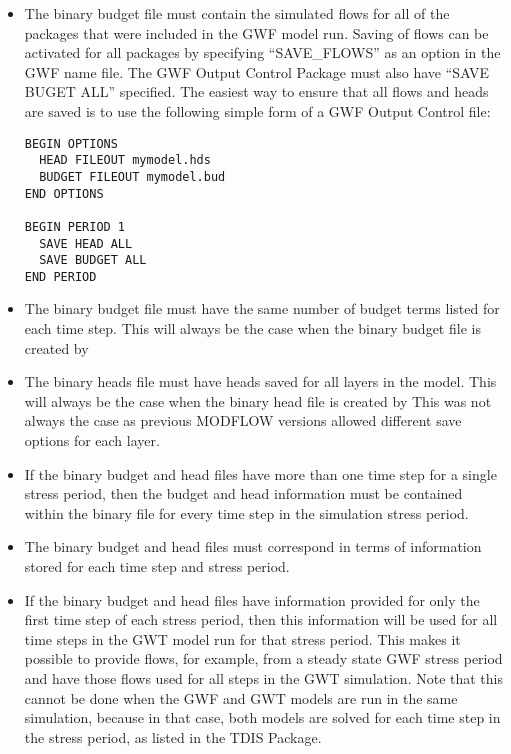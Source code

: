 \begin{itemize}
\begin{itemize}
\item The binary budget file must contain the simulated flows for all of the packages that were included in the GWF model run.  Saving of flows can be activated for all packages by specifying ``SAVE\_FLOWS'' as an option in the GWF name file.  The GWF Output Control Package must also have ``SAVE BUGET ALL'' specified.  The easiest way to ensure that all flows and heads are saved is to use the following simple form of a GWF Output Control file:

\begin{verbatim}
BEGIN OPTIONS
  HEAD FILEOUT mymodel.hds
  BUDGET FILEOUT mymodel.bud
END OPTIONS

BEGIN PERIOD 1
  SAVE HEAD ALL
  SAVE BUDGET ALL
END PERIOD
\end{verbatim}

\item The binary budget file must have the same number of budget terms listed for each time step.  This will always be the case when the binary budget file is created by \mfdot
\item The binary heads file must have heads saved for all layers in the model.  This will always be the case when the binary head file is created by \mfdot  This was not always the case as previous MODFLOW versions allowed different save options for each layer.
\item If the binary budget and head files have more than one time step for a single stress period, then the budget and head information must be contained within the binary file for every time step in the simulation stress period.
\item The binary budget and head files must correspond in terms of information stored for each time step and stress period.
\item If the binary budget and head files have information provided for only the first time step of each stress period, then this information will be used for all time steps in the GWT model run for that stress period.  This makes it possible to provide flows, for example, from a steady state GWF stress period and have those flows used for all steps in the GWT simulation.  Note that this cannot be done when the GWF and GWT models are run in the same simulation, because in that case, both models are solved for each time step in the stress period, as listed in the TDIS Package.
\end{itemize}

\end{itemize}

